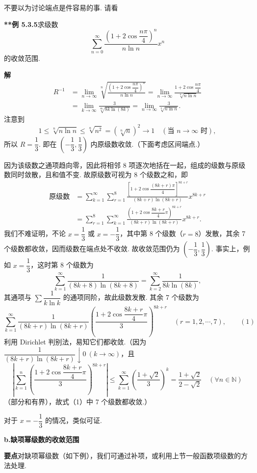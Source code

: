 \documentclass[UTF8, 12pt, fontset=fandol, oneside]{ctexart}
\begin{document}
不要以为讨论端点是件容易的事. 请看

\noindent\textbf{**例 5.3.5}\quad 求级数
\[
  \sum_{n=0}^{\infty}\frac{\left(1+2\cos\dfrac{n\pi}{4}\right)^n}{n\ln n}x^n
\]
的收敛范围.

\noindent\textbf{解}\quad
\[
\begin{aligned}
R^{-1}
&=\lim_{n\to\infty}\sqrt[n]{\frac{\left(1+2\cos\dfrac{n\pi}{4}\right)^n}{n\ln n}}
=\lim_{n\to\infty}\frac{1+2\cos\dfrac{n\pi}{4}}{\sqrt[n]{n\ln n}}\\
&=\lim_{k\to\infty}\frac3{\sqrt[8k]{8k\ln(8k)}}
=\lim_{n\to\infty}\frac3{\sqrt[n]{n\ln n}}.
\end{aligned}
\]
注意到
\[
  1\le\sqrt[n]{n\ln n}\le\sqrt[n]{n^2}=(\sqrt[n]{n})^2\to1\quad(\text{当 }n\to\infty\text{ 时}),
\]
所以 $R=\dfrac13$. 即在 $\left(-\dfrac13,\dfrac13\right)$ 内原级数收敛.（下面考虑区间端点.）

因为该级数之通项趋向零，因此将相邻 8 项逐次地括在一起，组成的级数与原级数同时敛散，且和值不变. 故原级数可视为 8 个级数之和，即
\[
\begin{aligned}
\text{原级数}
&=\sum_{k=1}^{\infty}\sum_{r=1}^{8}
\frac{\left[1+2\cos\dfrac{(8k+r)\pi}{4}\right]^{8k+r}}
{(8k+r)\ln(8k+r)}x^{8k+r}\\
&=\sum_{r=1}^{8}\sum_{k=1}^{\infty}
\frac{\left(1+2\cos\dfrac{8k+r}{4}\pi\right)^{8k+r}}
{(8k+r)\ln(8k+r)}x^{8k+r}.
\end{aligned}
\]
我们不难证明，不论 $x=\dfrac13$ 或 $x=-\dfrac13$，其中第 8 个级数（$r=8$）发散，其余 7 个级数都收敛，因而级数在端点处不收敛. 故收敛范围仍为
$\left(-\dfrac13,\dfrac13\right)$. 事实上，例如 $x=\dfrac13$，这时第 8 个级数为
\[
  \sum_{k=1}^{\infty}\frac1{(8k+8)\ln(8k+8)}
  =\sum_{k=2}^{\infty}\frac1{8k\ln(8k)},
\]
其通项与 $\displaystyle\sum\dfrac1{k\ln k}$ 的通项同阶，故此级数发散. 其余 7 个级数为
\[
  \sum_{k=1}^{\infty}\frac1{(8k+r)\ln(8k+r)}
  \left(\frac{1+2\cos\dfrac{8k+r}{4}\pi}{3}\right)^{8k+r}
  \quad(r=1,2,\cdots,7),
\qquad(1)
\]
利用 Dirichlet 判别法，易知它们都收敛.（因为
$\dfrac1{(8k+r)\ln(8k+r)}\downarrow0\ (k\to\infty)$，且
\[
  \left|\sum_{k=1}^{n}\left(\frac{1+2\cos\dfrac{8k+r}{4}\pi}{3}\right)^{8k+r}\right|
  \le\sum_{k=1}^{\infty}\left(\frac{1+\sqrt2}{3}\right)^k
  =\frac{1+\sqrt2}{2-\sqrt2}\quad(\forall n\in\mathbb N)
\]
（部分和有界），故式（1）中 7 个级数都收敛.）

对于 $x=-\dfrac13$ 的情况，类似可证.

\noindent\textbf{b.\quad 缺项幂级数的收敛范围}

\noindent\textbf{要点}\quad 对缺项幂级数（如下例），我们可通过补项，或利用上节一般函数项级数的方法处理.
\end{document}
